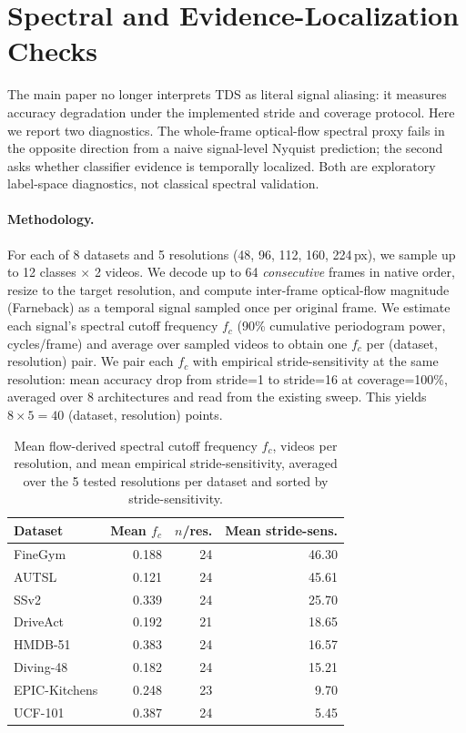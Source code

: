 \documentclass[runningheads]{llncs}
\newcommand{\tabtight}{\setlength{\tabcolsep}{3.5pt}\renewcommand{\arraystretch}{1.12}}
\newcommand{\TDS}{\textsc{TDS}}
\newcommand{\rev}[1]{\textcolor{revblue}{#1}}
\begin{document}
\section{\rev{Spectral and Evidence-Localization Checks}}
\label{sec:sup_nyquist}

\rev{The main paper no longer interprets \TDS{} as literal signal aliasing: it measures accuracy degradation under the implemented stride and coverage protocol.} Here we report two diagnostics. The whole-frame optical-flow spectral proxy fails in the opposite direction from a naive signal-level Nyquist prediction; the second asks whether classifier evidence is temporally localized. Both are exploratory label-space diagnostics, not classical spectral validation.

\paragraph{Methodology.} For each of 8 datasets and 5 resolutions (48, 96, 112, 160, 224\,px), we sample up to 12 classes $\times$ 2 videos. We decode up to 64 \emph{consecutive} frames in native order, resize to the target resolution, and compute inter-frame optical-flow magnitude (Farneback) as a temporal signal sampled once per original frame. We estimate each signal's spectral cutoff frequency $f_c$ (90\% cumulative periodogram power, cycles/frame) and average over sampled videos to obtain one $f_c$ per (dataset, resolution) pair. We pair each $f_c$ with empirical stride-sensitivity at the same resolution: mean accuracy drop from stride=1 to stride=16 at coverage=100\%, averaged over 8 architectures and read from the existing sweep. This yields $8\times5=40$ (dataset, resolution) points.

\begin{table}[!htbp]
\centering
\caption{Mean flow-derived spectral cutoff frequency $f_c$, videos per resolution, and mean empirical stride-sensitivity, averaged over the 5 tested resolutions per dataset and sorted by stride-sensitivity.}
\label{tab:nyquist_v2}
\scriptsize\tabtight
\begin{tabular}{l r r r}
\toprule
Dataset & Mean $f_c$ & $n$/res. & Mean stride-sens. \\
\midrule
FineGym       & 0.188 & 24 & 46.30 \\
AUTSL         & 0.121 & 24 & 45.61 \\
SSv2          & 0.339 & 24 & 25.70 \\
DriveAct      & 0.192 & 21 & 18.65 \\
HMDB-51       & 0.383 & 24 & 16.57 \\
Diving-48     & 0.182 & 24 & 15.21 \\
EPIC-Kitchens & 0.248 & 23 &  9.70 \\
UCF-101       & 0.387 & 24 &  5.45 \\
\bottomrule
\end{tabular}
\end{table}
\end{document}
